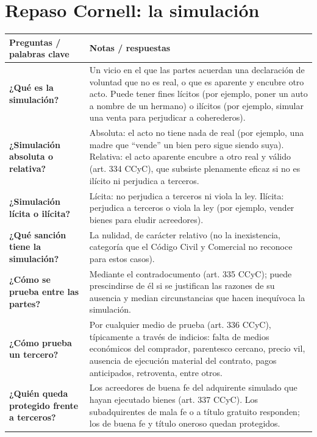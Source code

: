 \documentclass[12pt,oneside]{book}
\begin{document}
\section{Repaso Cornell: la simulación}
\begin{table}[H]
\centering
\begin{tabularx}{\textwidth}{
    >{\raggedright\arraybackslash}p{}
    >{\raggedright\arraybackslash}X
}
\toprule
\textbf{Preguntas / palabras clave} &
\textbf{Notas / respuestas} \\
\midrule

\textbf{¿Qué es la simulación?} &
Un vicio en el que las partes acuerdan una declaración de voluntad que no es real, o que es aparente y encubre otro acto. Puede tener fines lícitos (por ejemplo, poner un auto a nombre de un hermano) o ilícitos (por ejemplo, simular una venta para perjudicar a coherederos). \\

\textbf{¿Simulación absoluta o relativa?} &
Absoluta: el acto no tiene nada de real (por ejemplo, una madre que ``vende'' un bien pero sigue siendo suya). Relativa: el acto aparente encubre a otro real y válido (art. 334 CCyC), que subsiste plenamente eficaz si no es ilícito ni perjudica a terceros. \\

\textbf{¿Simulación lícita o ilícita?} &
Lícita: no perjudica a terceros ni viola la ley. Ilícita: perjudica a terceros o viola la ley (por ejemplo, vender bienes para eludir acreedores). \\

\textbf{¿Qué sanción tiene la simulación?} &
La nulidad, de carácter relativo (no la inexistencia, categoría que el Código Civil y Comercial no reconoce para estos casos). \\

\textbf{¿Cómo se prueba entre las partes?} &
Mediante el contradocumento (art. 335 CCyC); puede prescindirse de él si se justifican las razones de su ausencia y median circunstancias que hacen inequívoca la simulación. \\

\textbf{¿Cómo prueba un tercero?} &
Por cualquier medio de prueba (art. 336 CCyC), típicamente a través de indicios: falta de medios económicos del comprador, parentesco cercano, precio vil, ausencia de ejecución material del contrato, pagos anticipados, retroventa, entre otros. \\

\textbf{¿Quién queda protegido frente a terceros?} &
Los acreedores de buena fe del adquirente simulado que hayan ejecutado bienes (art. 337 CCyC). Los subadquirentes de mala fe o a título gratuito responden; los de buena fe y título oneroso quedan protegidos. \\


\end{tabularx}
\end{table}
\end{document}
